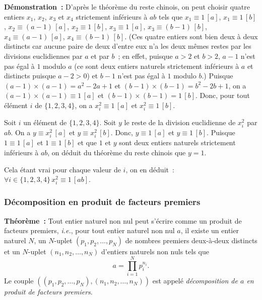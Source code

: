\medskip

\noindent\textbf{Démonstration :} 
    D'après le théorème du reste chinois, on peut choisir quatre entiers $x_1$, $x_2$, $x_3$ et $x_4$ strictement inférieurs à $ab$ tels que $x_1 \equiv 1 \, [a]$, $x_1 \equiv 1 \, [b]$, $x_2 \equiv (a-1) \, [a]$, $x_2 \equiv 1 \, [b]$, $x_3 \equiv 1 \, [a]$, $x_3 \equiv (b-1) \, [b]$, $x_4 \equiv (a-1) \, [a]$, $x_4 \equiv (b-1) \, [b]$. 
    (Ces quatre entiers sont bien deux à deux distincts car aucune paire de deux d'entre eux n'a les deux mêmes restes par les divisions euclidiennes par $a$ et par $b$ ; en effet, puisque $a>2$ et $b > 2$, $a-1$ n'est pas égal à $1$ modulo $a$ (ce sont deux entiers naturels strictement inférieurs à $a$ et distincts puisque $a-2 > 0$) et $b-1$ n'est pas égal à $1$ modulo $b$.) 
    Puisque $(a-1) \times (a-1) = a^2 - 2 a + 1$ et $(b-1) \times (b-1) = b^2 - 2 b + 1$, on a $(a-1) \times (a-1) \equiv 1 \, [a]$ et $(b-1) \times (b-1) = 1 \, [b]$.
    Donc, pour tout élément $i$ de $\lbrace 1, 2, 3, 4 \rbrace$, on a $x_i^2 \equiv 1 \, [a]$ et $x_i^2 \equiv 1 \, [b]$. 
    
    Soit $i$ un élément de $\lbrace 1, 2, 3, 4 \rbrace$. 
    Soit $y$ le reste de la division euclidienne de $x_i^2$ par $ab$. 
    On a $y \equiv x_i^2 \, [a]$ et $y \equiv x_i^2 \, [b]$. 
    Donc, $y \equiv 1 \, [a]$ et $y \equiv 1 \, [b]$. 
    Puisque $1 \equiv 1 \, [a]$ et $1 \equiv 1 \, [b]$ et que $1$ et $y$ sont deux entiers naturels strictement inférieurs à $a b$, on déduit du théorème du reste chinois que $y = 1$.  

    Cela étant vrai pour chaque valeur de $i$, on en déduit : $\forall i \in \lbrace 1, 2, 3, 4 \rbrace \, x_i^2 \equiv 1 \, [a b]$.

\done


\subsubsection{Décomposition en produit de facteurs premiers}
\label{subsub:dec_fact_prem}

\bigskip

\noindent\textbf{Théorème :} 
Tout entier naturel non nul peut s'écrire comme un produit de facteurs premiers, \textit{i.e.}, pour tout entier naturel non nul $a$, il existe un entier naturel $N$, un $N$-uplet $\left( p_1, p_2, \dots, p_N \right)$ de nombres premiers deux-à-deux distincts et un $N$-uplet $\left( n_1, n_2, \dots, n_N \right)$ d'entiers naturels non nuls tels que
\begin{equation*}
    a = \prod_{i=1}^N p_i^{n_i}.
\end{equation*}
Le couple $\left( \left( p_1, p_2, \dots, p_N \right), \left( n_1, n_2, \dots, n_N \right)\right)$ est appelé \textit{décomposition de $a$ en produit de facteurs premiers}.

